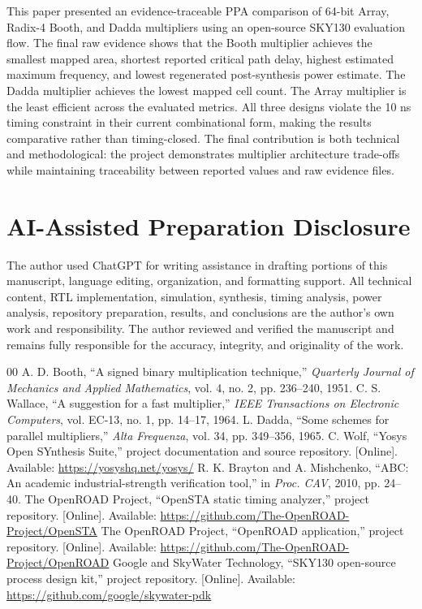 \documentclass[conference]{IEEEtran}
\begin{document}
This paper presented an evidence-traceable PPA comparison of 64-bit Array, Radix-4 Booth, and Dadda multipliers using an open-source SKY130 evaluation flow. The final raw evidence shows that the Booth multiplier achieves the smallest mapped area, shortest reported critical path delay, highest estimated maximum frequency, and lowest regenerated post-synthesis power estimate. The Dadda multiplier achieves the lowest mapped cell count. The Array multiplier is the least efficient across the evaluated metrics. All three designs violate the 10 ns timing constraint in their current combinational form, making the results comparative rather than timing-closed. The final contribution is both technical and methodological: the project demonstrates multiplier architecture trade-offs while maintaining traceability between reported values and raw evidence files.

\section*{AI-Assisted Preparation Disclosure}
The author used ChatGPT for writing assistance in drafting portions of this manuscript, language editing, organization, and formatting support. All technical content, RTL implementation, simulation, synthesis, timing analysis, power analysis, repository preparation, results, and conclusions are the author's own work and responsibility. The author reviewed and verified the manuscript and remains fully responsible for the accuracy, integrity, and originality of the work.

\begin{thebibliography}{00}
 A. D. Booth, ``A signed binary multiplication technique,'' \emph{Quarterly Journal of Mechanics and Applied Mathematics}, vol. 4, no. 2, pp. 236--240, 1951.
 C. S. Wallace, ``A suggestion for a fast multiplier,'' \emph{IEEE Transactions on Electronic Computers}, vol. EC-13, no. 1, pp. 14--17, 1964.
 L. Dadda, ``Some schemes for parallel multipliers,'' \emph{Alta Frequenza}, vol. 34, pp. 349--356, 1965.
 C. Wolf, ``Yosys Open SYnthesis Suite,'' project documentation and source repository. [Online]. Available: \url{https://yosyshq.net/yosys/}
 R. K. Brayton and A. Mishchenko, ``ABC: An academic industrial-strength verification tool,'' in \emph{Proc. CAV}, 2010, pp. 24--40.
 The OpenROAD Project, ``OpenSTA static timing analyzer,'' project repository. [Online]. Available: \url{https://github.com/The-OpenROAD-Project/OpenSTA}
 The OpenROAD Project, ``OpenROAD application,'' project repository. [Online]. Available: \url{https://github.com/The-OpenROAD-Project/OpenROAD}
 Google and SkyWater Technology, ``SKY130 open-source process design kit,'' project repository. [Online]. Available: \url{https://github.com/google/skywater-pdk}
\end{thebibliography}
\end{document}
